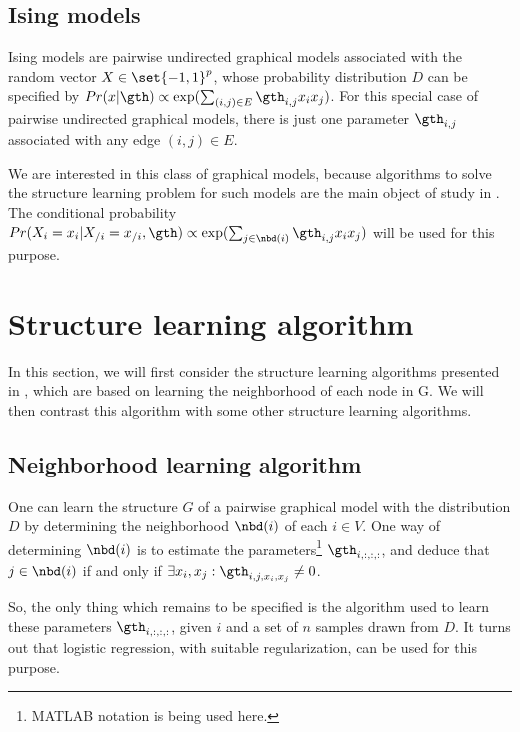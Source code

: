 \documentclass{article}
\begin{document}
\subsection{Ising models}
\label{sec:Ising models}
Ising models are pairwise undirected graphical models associated with the random vector $X \in \set{-1, 1}^{p}$, whose probability distribution $D$ can be specified by $Pr(x|\gth) \propto \exp(\sum_{(i, j) \in E} \gth_{i, j}x_i x_j)$. For this special case of pairwise undirected graphical models, there is just one parameter $\gth_{i, j}$ associated with any edge $(i, j) \in E$.

We are interested in this class of graphical models, because algorithms to solve the structure learning problem for such models are the main object of study in \citet{ravikumarIsing09}. The conditional probability $Pr(X_i = x_i|X_{/i} = x_{/i}, \gth) \propto \exp(\sum_{j \in \nbd(i)} \gth_{i, j}x_i x_j)$ will be used for this purpose.

\section{Structure learning algorithm}
In this section, we will first consider the structure learning algorithms presented in \citet{ravikumarIsing09}, which are based on learning the neighborhood of each node in G. We will then contrast this algorithm with some other structure learning algorithms.

\subsection{Neighborhood learning algorithm}
\label{sec:Neighborhood learning algorithm}
One can learn the structure $G$ of a pairwise graphical model with the distribution $D$ by determining the neighborhood $\nbd(i)$ of each $i \in V$. One way of determining $\nbd(i)$ is to estimate the parameters\footnote{MATLAB notation is being used here.} $\gth_{i, :, :, :}$, and deduce that $j \in \nbd(i)$ if and only if $\exists x_i, x_j: \gth_{i, j, x_i, x_j} \neq 0$.

So, the only thing which remains to be specified is the algorithm used to learn these parameters $\gth_{i, :, :, :}$, given $i$ and a set of $n$ samples drawn from $D$. It turns out that logistic regression, with suitable regularization, can be used for this purpose.
\end{document}
